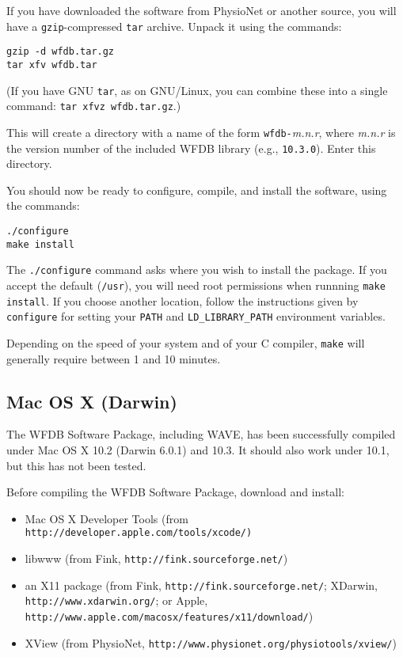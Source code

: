 \documentclass[twoside]{article}
\begin{document}
If you have downloaded the software from PhysioNet or another source, you
will have a {\tt gzip}-compressed {\tt tar} archive.  Unpack it using
the commands:

\begin{verbatim}
gzip -d wfdb.tar.gz
tar xfv wfdb.tar
\end{verbatim}

(If you have GNU {\tt tar}, as on GNU/Linux, you can combine these into a
single command: {\tt tar xfvz wfdb.tar.gz}.)

This will create a directory with a name of the form {\tt wfdb-}{\em m.n.r},
where {\em m.n.r} is the version number of the included WFDB library (e.g.,
{\tt 10.3.0}).  Enter this directory.

You should now be ready to configure, compile, and install the software, using
the commands:

\begin{verbatim}
./configure
make install
\end{verbatim}

The {\tt ./configure} command asks where you wish to install the package.
If you accept the default ({\tt /usr}), you will need root permissions when
runnning {\tt make install}.  If you choose another location, follow the
instructions given by {\tt configure} for setting your {\tt PATH} and
{\tt LD\_LIBRARY\_PATH} environment variables.

Depending on the speed of your system and of your C compiler, {\tt make} will
generally require between 1 and 10 minutes.

\subsection*{Mac OS X (Darwin)}

The WFDB Software Package, including WAVE, has been successfully compiled under
Mac OS X 10.2 (Darwin 6.0.1) and 10.3.  It should also work under 10.1, but
this has not been tested.

Before compiling the WFDB Software Package, download and install:

\begin{itemize}
\item
Mac OS X Developer Tools (from {\tt
http://\-devel\-oper.\-apple.\-com/\-tools/\-xcode/)}
\item
libwww (from Fink, {\tt http://\-fink.\-source\-forge.\-net/})
\item
an X11 package  (from Fink, {\tt http://\-fink.\-source\-forge.\-net/};
XDarwin, {\tt http://\-www.\-xdar\-win.\-org/}; or Apple,
{\tt http://\-www.\-apple.\-com/\-macosx/\-features/\-x11/\-download/})
\item
XView (from PhysioNet,
{\tt http://\-www.\-physionet.\-org/\-physiotools/\-xview/})
\end{itemize}
\end{document}
